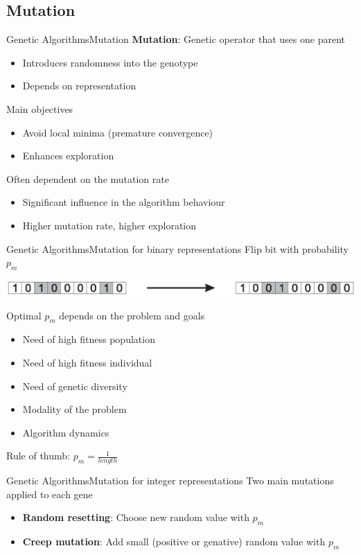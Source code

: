 \documentclass[10pt,compress]{beamer} %
\begin{document}
\subsection{Mutation}
\begin{frame}{Genetic Algorithms}{Mutation}
	\textbf{Mutation}: Genetic operator that uses one parent
	\begin{itemize}
		\item Introduces randomness into the genotype
		\item Depends on representation
  	\end{itemize}
	Main objectives
	\begin{itemize}
		\item Avoid local minima (premature convergence)
		\item Enhances exploration
	\end{itemize}
	Often dependent on the \alert{mutation rate}
	\begin{itemize}
		\item Significant influence in the algorithm behaviour
		\item Higher mutation rate, higher exploration
	\end{itemize}
\end{frame}

\begin{frame}{Genetic Algorithms}{Mutation for binary representations}
	Flip bit with probability $p_m$
	\vspace{-0.7cm}
	\begin{center}
	\includegraphics[width=0.8\linewidth]{figs/flip.eps}
	\end{center}
	\vspace{-0.7cm}
	Optimal $p_m$ depends on the problem and goals
	\begin{itemize}
		\item Need of high fitness population
		\item Need of high fitness individual
		\item Need of genetic diversity
		\item Modality of the problem
		\item Algorithm dynamics
  	\end{itemize}
	Rule of thumb: $p_m = \frac{1}{length}$
\end{frame}

\begin{frame}{Genetic Algorithms}{Mutation for integer representations}
	Two main mutations applied to each gene
	\begin{itemize}
		\item \textbf{Random resetting}: Choose new random value with $p_m$
		\item \textbf{Creep mutation}: Add small (positive or genative) random value with $p_m$
	\end{itemize}
\end{frame}
\end{document}

